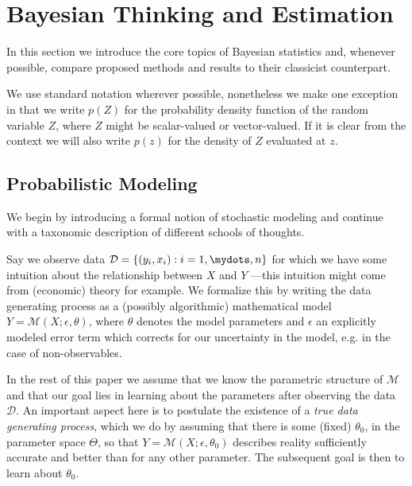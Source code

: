 \setlength{\abovedisplayskip}{2pt}
\setlength{\belowdisplayskip}{2pt}
\section{Bayesian Thinking and Estimation}
\label{sec:bayesian_thinking}
In this section we introduce the core topics of Bayesian statistics and, whenever possible, compare proposed methods and results to their classicist counterpart.

We use standard notation wherever possible, nonetheless we make one exception in that we write $p(Z)$ for the probability density function of the random variable $Z$, where $Z$ might be scalar-valued or vector-valued.
If it is clear from the context we will also write $p(z)$ for the density of $Z$ evaluated at $z$.

\subsection{Probabilistic Modeling}
We begin by introducing a formal notion of stochastic modeling and continue with a taxonomic description of different schools of thoughts.

Say we observe data $\mathcal{D} = \{(y_i, x_i) : i=1,\mydots,n\}$ for which we have some intuition about the relationship between $X$ and $Y$ ---this intuition might come from (economic) theory for example.
We formalize this by writing the data generating process as a (possibly algorithmic) mathematical model $Y = \mathcal{M}(X; \epsilon, \theta)$, where $\theta$ denotes the model parameters and $\epsilon$ an explicitly modeled error term which corrects for our uncertainty in the model, e.g. in the case of non-observables.

In the rest of this paper we assume that we know the parametric structure of $\mathcal{M}$ and that our goal lies in learning about the parameters after observing the data $\mathcal{D}$.
An important aspect here is to postulate the existence of a \textit{true data generating process}, which we do by assuming that there is some (fixed) $\theta_0$, in the parameter space $\Theta$, so that $Y = \mathcal{M}(X; \epsilon, \theta_0)$ describes reality sufficiently accurate and better than for any other parameter.
The subsequent goal is then to learn about $\theta_0$.

